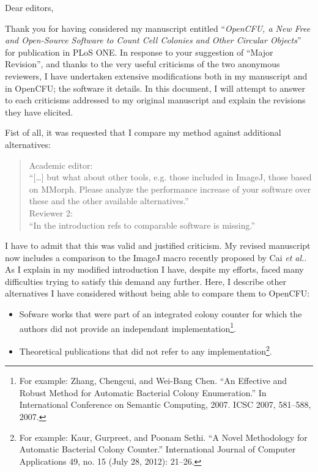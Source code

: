 \documentclass{letter}
\newcommand{\Otitle}{\emph{OpenCFU, a New Free and Open-Source Software to Count Cell Colonies and
Other Circular Objects}}
\begin{document}
 
\begin{letter}{}
\opening{Dear editors,}
 Thank you for having considered my manuscript entitled ``\Otitle{}'' for publication in PLoS ONE.
 In response to your suggestion of ``Major Revision'', and thanks to the very useful criticisms of the two anonymous reviewers, 
 I have undertaken extensive modifications both in my manuscript and in OpenCFU; the software it details.
 In this document, I will attempt to answer to each criticisms addressed to my original manuscript and explain the revisions they have elicited.

 Fist of all, it was requested that I compare my method against additional alternatives:
  \begin{quote}
 Academic editor:\\
 ``[\ldots] but what about other tools, e.g. those included in ImageJ, those based on MMorph. 
 Please analyze the performance increase of your software over these and the other available alternatives.''\\
 Reviewer 2:\\
 ``In the introduction refs to comparable software is missing.''
  \end{quote} 
 I have to admit that this was valid and justified criticism.
 My revised manuscript now includes a comparison to the ImageJ macro recently proposed by Cai \emph{et al.}.
 As I explain in my modified introduction I have, despite my efforts, faced many difficulties trying to satisfy this demand any further.
 Here, I describe other alternatives I have considered without being able to compare them to OpenCFU:

\begin{itemize}
  
	\item Sofware works that were part of an integrated colony counter for which the authors did not provide an independant implementation\footnote{For example: Zhang, Chengcui, and Wei-Bang Chen. ``An Effective and Robust Method for Automatic Bacterial Colony Enumeration.'' In International Conference on Semantic Computing, 2007. ICSC 2007, 581–588, 2007.}.
	
	\item Theoretical publications that did not refer to any implementation\footnote{For example: Kaur, Gurpreet, and Poonam Sethi. ``A Novel Methodology for Automatic Bacterial Colony Counter.'' International Journal of Computer Applications 49, no. 15 (July 28, 2012): 21–26.}. 
	

\end{itemize}
\end{letter}
\end{document}
